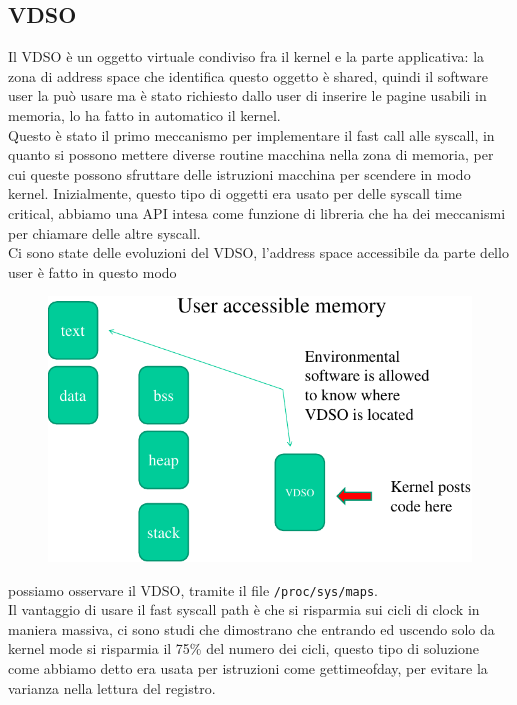 \documentclass[12pt, oneside]{extbook}
\begin{document}
\subsection{VDSO}
Il VDSO è un oggetto virtuale condiviso fra il kernel e la parte applicativa: la zona di address space che identifica questo oggetto è shared, quindi il software user la può usare ma è stato richiesto dallo user di inserire le pagine usabili in memoria, lo ha fatto in automatico il kernel.\\ Questo è stato il primo meccanismo per implementare il fast call alle syscall, in quanto si possono mettere diverse routine macchina nella zona di memoria, per cui queste possono sfruttare delle istruzioni macchina per scendere in modo kernel. Inizialmente, questo tipo di oggetti era usato per delle syscall time critical, abbiamo una API intesa come funzione di libreria che ha dei meccanismi per chiamare delle altre syscall.\\ Ci sono state delle evoluzioni del VDSO, l'address space accessibile da parte dello user è fatto in questo modo
\begin{figure}[!h]
	\includegraphics[scale=0.5]{immagini/vdso_user_space.png}
\end{figure}
possiamo osservare il VDSO, tramite il file \texttt{/proc/sys/maps}.\\ Il vantaggio di usare il fast syscall path è che si risparmia sui cicli di clock in maniera massiva, ci sono studi che dimostrano che entrando ed uscendo solo da kernel mode si risparmia il 75\% del numero dei cicli, questo tipo di soluzione come abbiamo detto era usata per istruzioni come \textsf{gettimeofday}, per evitare la varianza nella lettura del registro.
\end{document}
